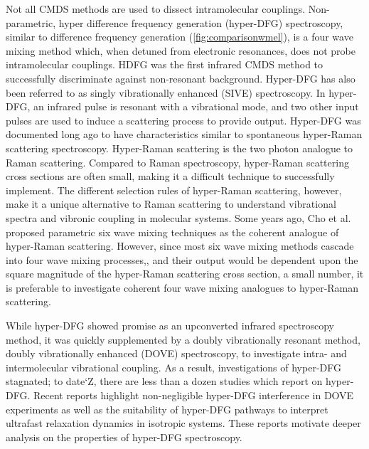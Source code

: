 \documentclass[aip, jcp, reprint, onecolumn]{revtex4-2}
\begin{document}
Not all CMDS methods are used to dissect intramolecular couplings.\cite{Shen1987_CPL}
Non-parametric, hyper difference frequency generation (hyper-DFG) spectroscopy, similar to difference frequency generation (\autoref{fig:comparisonwmel}), is a four wave mixing method which, when detuned from  electronic resonances, does not probe intramolecular couplings. 
HDFG was the first infrared CMDS method to successfully discriminate against non-resonant background.\cite{RN351, RN352}
Hyper-DFG has also been referred to as singly vibrationally enhanced (SIVE) spectroscopy. \cite{RN351}
In hyper-DFG, an infrared pulse is resonant with a vibrational mode, and two other input pulses are used to induce a scattering process to provide output.
Hyper-DFG was documented long ago to have characteristics similar to spontaneous hyper-Raman scattering spectroscopy. \cite{RN352}
Hyper-Raman scattering is the two photon analogue to Raman scattering. \cite{Cyvin1965, Terhune1965}
Compared to Raman spectroscopy, hyper-Raman scattering cross sections are often small, making it a difficult technique to successfully implement.\cite{RN515, Kelley2010} 
The different selection rules of hyper-Raman scattering, however, make it a unique alternative to Raman scattering to understand vibrational spectra and vibronic coupling in molecular systems.
Some years ago, Cho et al. proposed parametric six wave mixing techniques as the coherent analogue of hyper-Raman scattering. \cite{Cho1997, Cho1998}
However, since most six wave mixing methods cascade into four wave mixing processes,\cite{RN243, Cho2000_Cascade}, and their output would be dependent upon the square magnitude of the hyper-Raman scattering cross section, a small number,\cite{RN515} it is preferable to investigate coherent four wave mixing analogues to hyper-Raman scattering.

While hyper-DFG showed promise as an upconverted infrared spectroscopy method, it was quickly supplemented by a doubly vibrationally resonant method, doubly vibrationally enhanced (DOVE) spectroscopy, to investigate intra- and intermolecular vibrational coupling. \cite{RN345, RN101, Cho2000}
As a result, investigations of hyper-DFG stagnated; to date`Z, there are less than a dozen studies which report on hyper-DFG. \cite{RN350, RN416, RN351, RN352, RN353, Chen1998, RN362, RN418, Bonn2024, McDonnell2024}
Recent reports highlight non-negligible hyper-DFG interference in DOVE experiments as well as the suitability of hyper-DFG pathways to interpret ultrafast relaxation dynamics in isotropic systems. \cite{Bonn2024, McDonnell2024}
These reports motivate deeper analysis on the properties of hyper-DFG spectroscopy. 
\end{document}
